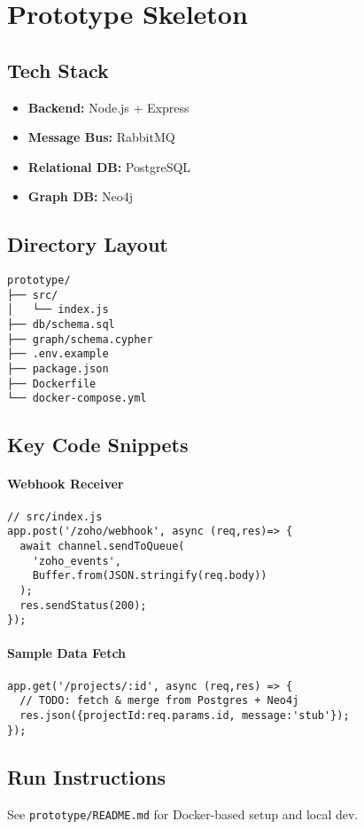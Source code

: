 \section{Prototype Skeleton}

\subsection{Tech Stack}
\begin{itemize}
  \item \textbf{Backend:} Node.js + Express
  \item \textbf{Message Bus:} RabbitMQ
  \item \textbf{Relational DB:} PostgreSQL
  \item \textbf{Graph DB:} Neo4j
\end{itemize}

\subsection{Directory Layout}
\begin{verbatim}
prototype/
├── src/
│   └── index.js
├── db/schema.sql
├── graph/schema.cypher
├── .env.example
├── package.json
├── Dockerfile
└── docker-compose.yml
\end{verbatim}

\subsection{Key Code Snippets}
\paragraph{Webhook Receiver}
\begin{verbatim}
// src/index.js
app.post('/zoho/webhook', async (req,res)=> {
  await channel.sendToQueue(
    'zoho_events',
    Buffer.from(JSON.stringify(req.body))
  );
  res.sendStatus(200);
});
\end{verbatim}

\paragraph{Sample Data Fetch}
\begin{verbatim}
app.get('/projects/:id', async (req,res) => {
  // TODO: fetch & merge from Postgres + Neo4j
  res.json({projectId:req.params.id, message:'stub'});
});
\end{verbatim}

\subsection{Run Instructions}
See \texttt{prototype/README.md} for Docker-based setup and local dev. 

